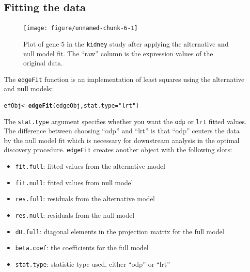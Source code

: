 \documentclass{article}\usepackage[]{graphicx}\usepackage[]{color}
\makeatletter
\newcommand{\hlstr}[1]{\textcolor[rgb]{0.192,0.494,0.8}{#1}}%
\newcommand{\hlstd}[1]{\textcolor[rgb]{0.345,0.345,0.345}{#1}}%
\newcommand{\hlkwb}[1]{\textcolor[rgb]{0.69,0.353,0.396}{#1}}%
\newcommand{\hlkwc}[1]{\textcolor[rgb]{0.333,0.667,0.333}{#1}}%
\newcommand{\hlkwd}[1]{\textcolor[rgb]{0.737,0.353,0.396}{\textbf{#1}}}%
\newenvironment{kframe}{%
 \def\at@end@of@kframe{}%
 \ifinner\ifhmode%
  \def\at@end@of@kframe{\end{minipage}}%
  \begin{minipage}{\columnwidth}%
 \fi\fi%
 \def\FrameCommand##1{\hskip\@totalleftmargin \hskip-\fboxsep
 \colorbox{shadecolor}{##1}\hskip-\fboxsep
     \hskip-\linewidth \hskip-\@totalleftmargin \hskip\columnwidth}%
 \MakeFramed {\advance\hsize-\width
   \@totalleftmargin\z@ \linewidth\hsize
   \@setminipage}}%
 {\par\unskip\endMakeFramed%
 \at@end@of@kframe}
\newenvironment{knitrout}{}{} %
\makeatother
\begin{document}
\subsection{Fitting the data}

\begin{figure}[t]
 \centering
\begin{knitrout}
\color{fgcolor}

{\centering \texttt{[image: figure/unnamed-chunk-6-1]} 

}



\end{knitrout}
\caption{Plot of gene 5 in the {\tt kidney} study after applying the alternative and null model fit. The ``raw'' column is the expression values of the original data.}
\label{fig:kplotFit}
\end{figure}

The {\tt edgeFit} function is an implementation of least squares using the alternative and null models:
\begin{knitrout}
\color{fgcolor}\begin{kframe}
\begin{alltt}
\hlstd{efObj} \hlkwb{<-} \hlkwd{edgeFit}\hlstd{(edgeObj,} \hlkwc{stat.type} \hlstd{=} \hlstr{"lrt"}\hlstd{)}
\end{alltt}
\end{kframe}
\end{knitrout}
The {\tt stat.type} argument specifies whether you want the {\tt odp} or {\tt lrt} fitted values. The difference between choosing ``odp'' and ``lrt'' is that ``odp'' centers the data by the null model fit which is necessary for downstream analysis in the optimal discovery procedure. {\tt edgeFit} creates another object with the following slots:
\begin{itemize}
\item {\tt fit.full}: fitted values from the alternative model
\item {\tt fit.null}: fitted values from null model
\item {\tt res.full}: residuals from the alternative model
\item {\tt res.null}: residuals from the null model
\item {\tt dH.full}: diagonal elements in the projection matrix for the full model
\item {\tt beta.coef}: the coefficients for the full model
\item {\tt stat.type}: statistic type used, either ``odp'' or ``lrt''
\end{itemize}
\end{document}
